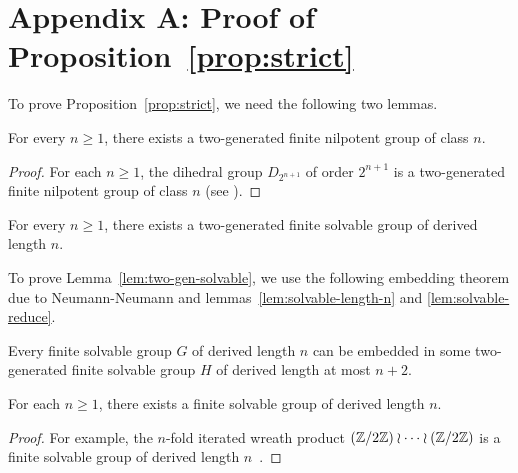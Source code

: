 \section{Appendix A: Proof of Proposition~\ref{prop:strict}}\label{sec:appendix}

To prove Proposition~\ref{prop:strict},
we need the following two lemmas.

\begin{lemma}\label{lem:two-gen-nilpotent}
  For every \(n \geq 1\), there exists a two-generated finite nilpotent group of class \(n\).
\end{lemma}
\begin{proof}
  For each \(n \geq 1\), the dihedral group \(D_{2^{n + 1}}\) of order \(2^{n + 1}\)
  is a two-generated finite nilpotent group of class \(n\) (see \eg \cite[p.\ 191, Example]{Dummit-Foote-2004}).
\end{proof}

\begin{lemma}\label{lem:two-gen-solvable}
  For every \(n \geq 1\), there exists a two-generated finite solvable group of derived length \(n\).
\end{lemma}
To prove Lemma~\ref{lem:two-gen-solvable}, we use the following embedding theorem due to Neumann-Neumann
and lemmas~\ref{lem:solvable-length-n} and \ref{lem:solvable-reduce}.

\begin{theorem}\label{thm:embed-solvable}
  Every finite solvable group \(G\) of derived length \(n\) can be embedded in
  some two-generated finite solvable group \(H\) of derived length at most \(n + 2\).
\end{theorem}


\begin{lemma}\label{lem:solvable-length-n}
  For each \(n \geq 1\), there exists a finite solvable group of derived length \(n\).
\end{lemma}
\begin{proof}
  For example, the \(n\)-fold iterated wreath product \((\mathbb{Z} / 2 \mathbb{Z}) \wr \dotsb \wr (\mathbb{Z} / 2 \mathbb{Z})\)
  is a finite solvable group of derived length \(n\)~\cite[9.22 Lemma]{rose-group}.
\end{proof}


